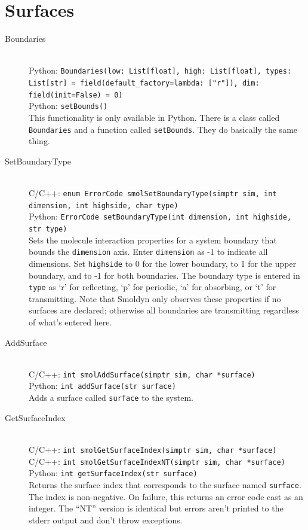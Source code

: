 \documentclass {book}
\newcommand {\ttt} {\texttt}
\begin{document}
\section{Surfaces}

\begin{description}

\item[Boundaries]
\hfill \\
Python: \ttt{Boundaries(low: List[float], high: List[float], types: List[str] = field(default\_factory=lambda: ["r"]), dim: field(init=False) = 0)}\\
Python: \ttt{setBounds()}\\
This functionality is only available in Python. There is a class called \ttt{Boundaries} and a function called \ttt{setBounds}. They do basically the same thing.

\item[SetBoundaryType]
\hfill \\
C/C++: \ttt{enum ErrorCode smolSetBoundaryType(simptr sim, int dimension, int highside, char type)}\\
Python: \ttt{ErrorCode setBoundaryType(int dimension, int highside, str type)}\\
Sets the molecule interaction properties for a system boundary that bounds the \ttt{dimension} axis. Enter \ttt{dimension} as -1 to indicate all dimensions. Set \ttt{highside} to 0 for the lower boundary, to 1 for the upper boundary, and to -1 for both boundaries. The boundary type is entered in \ttt{type} as `r' for reflecting, `p' for periodic, `a' for absorbing, or `t' for transmitting. Note that Smoldyn only observes these properties if no surfaces are declared; otherwise all boundaries are transmitting regardless of what's entered here.

\item[AddSurface]
\hfill \\
C/C++: \ttt{int smolAddSurface(simptr sim, char *surface)}\\
Python: \ttt{int addSurface(str surface)}\\
Adds a surface called \ttt{surface} to the system.

\item[GetSurfaceIndex]
\hfill \\
C/C++: \ttt{int smolGetSurfaceIndex(simptr sim, char *surface)}\\
C/C++: \ttt{int smolGetSurfaceIndexNT(simptr sim, char *surface)}\\
Python: \ttt{int getSurfaceIndex(str surface)}\\
Returns the surface index that corresponds to the surface named \ttt{surface}. The index is non-negative. On failure, this returns an error code cast as an integer. The ``NT'' version is identical but errors aren't printed to the stderr output and don't throw exceptions.


\end{description}
\end{document}
